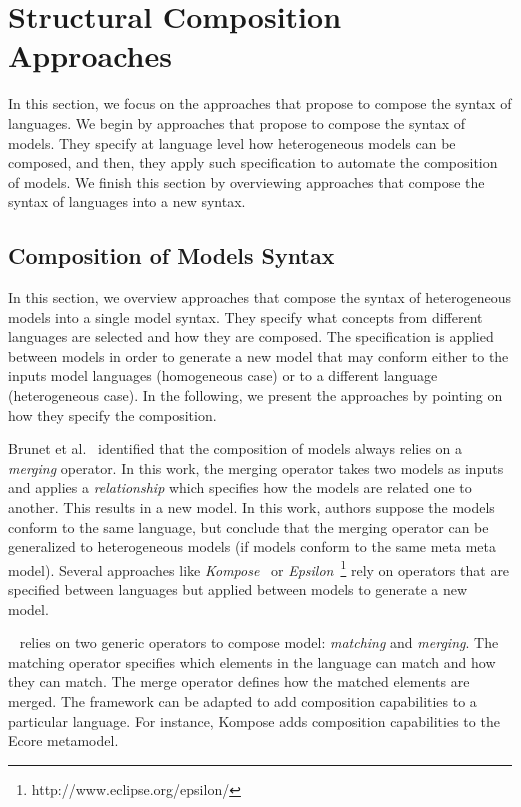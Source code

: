 \section{Structural Composition Approaches}
In this section, we focus on the approaches that propose to compose the syntax of languages. We begin by approaches that propose to compose the syntax of models. They specify at language level how heterogeneous models can be composed, and then, they apply such specification to automate the composition of models. We finish this section by overviewing approaches that compose the syntax of languages into a new syntax. 

 	
 \subsection{Composition of Models Syntax}

In this section, we overview approaches that compose the syntax of heterogeneous models into a single model syntax. They specify what concepts from different languages are selected and how they are composed. The specification is applied between models in order to generate a new model that may conform either to the inputs model languages (homogeneous case) or to a different language (heterogeneous case). In the following, we present the approaches by pointing on how they specify the composition.   

Brunet et al.~\cite{mergemanifest} identified that the composition of models always relies on a \emph{merging} operator. In this work, the merging operator takes two models as inputs and applies a \emph{relationship} which specifies how the models are related one to another. This results in a new model. In this work, authors suppose the models conform to the same language, but conclude that the merging operator can be generalized to heterogeneous models (if models conform to the same meta meta model). Several approaches like \emph{Kompose}~\cite{kompose} or \emph{Epsilon}~\cite{epsilon}\footnote{http://www.eclipse.org/epsilon/} rely on operators that are specified between languages but applied between models to generate a new model. 
    		
~\cite{kompose} relies on two generic operators to compose model: \emph{matching} and \emph{merging}. The matching operator specifies which elements in the language can match and how they can match. The merge operator defines how the matched elements are merged. The framework can be adapted to add composition capabilities to a particular language. For instance, Kompose adds composition capabilities to the Ecore metamodel. 
    		
